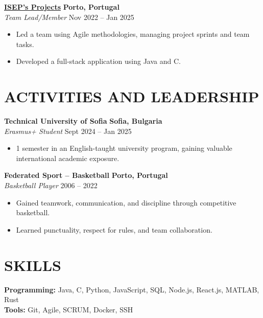 \documentclass[10pt, letterpaper]{article}
\newenvironment{highlights}{
    \begin{itemize}[
        topsep=0.10 cm,
        parsep=0.10 cm,
        partopsep=0pt,
        itemsep=0pt,
        leftmargin=1cm %
    ]
}{
    \end{itemize}
}
\begin{document}
\textbf{\href{https://purenimble.github.io/projects}{ISEP’s Projects}} \hfill \textbf{Porto, Portugal} \\
\textit{Team Lead/Member} \hfill Nov 2022 – Jan 2025 \\
\begin{highlights}
    \item Led a team using Agile methodologies, managing project sprints and team tasks.
    \item Developed a full-stack application using Java and C.
\end{highlights}

\section{ACTIVITIES AND LEADERSHIP}
\textbf{Technical University of Sofia} \hfill \textbf{Sofia, Bulgaria} \\
\textit{Erasmus+ Student} \hfill Sept 2024 – Jan 2025 \\
\begin{highlights}
    \item 1 semester in an English-taught university program, gaining valuable international academic exposure.
\end{highlights}

\textbf{Federated Sport – Basketball} \hfill \textbf{Porto, Portugal} \\
\textit{Basketball Player} \hfill 2006 – 2022 \\
\begin{highlights}
    \item Gained teamwork, communication, and discipline through competitive basketball.
    \item Learned punctuality, respect for rules, and team collaboration.
\end{highlights}

\section{SKILLS}
\textbf{Programming:} Java, C, Python, JavaScript, SQL, Node.js, React.js, MATLAB, Rust \\
\textbf{Tools:} Git, Agile, SCRUM, Docker, SSH
\end{document}
